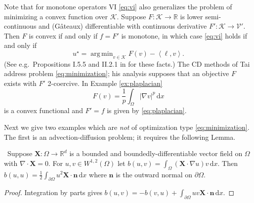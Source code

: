 \documentclass[review,hidelinks,onefignum,onetabnum,final]{siamart220329}  %
\newcommand{\RR}{\mathbb{R}}
\newcommand{\grad}{\nabla}
\newcommand{\Div}{\nabla\cdot}
\newcommand{\bn}{\mathbf{n}}
\newcommand{\bX}{\mathbf{X}}
\newcommand{\cK}{\mathcal{K}}
\newcommand{\cV}{\mathcal{V}}
\newcommand{\ip}[2]{\left<#1,#2\right>}
\newcommand{\dx}{\, \mathrm{d}x}
\DeclareMathOperator*{\argmin}{arg\,min}
\begin{document}
Note that for monotone operators VI \eqref{eq:vi} also generalizes the problem of minimizing a convex function over $\cK$.  Suppose $F:\cK \to \RR$ is lower semi-continuous and (G\^ateaux) differentiable with continuous derivative $F':\cK \to \cV'$.  Then $F$ is convex if and only if $f=F'$ is monotone, in which case \eqref{eq:vi} holds if and only if
\begin{equation}
u^\star = \argmin_{v\in\cK} F(v) - \ip{\ell}{v}. \label{eq:minimization}
\end{equation}
(See e.g.~Propositions I.5.5 and II.2.1 in \cite{EkelandTemam1976} for these facts.)  The CD methods of Tai \cite{Tai2003} address problem \eqref{eq:minimization}; his analysis supposes that an objective $F$ exists with $F'$ 2-coercive.  In Example \ref{ex:plaplacian}
\begin{equation}
F(v) = \frac{1}{p} \int_\Omega |\grad v|^p\dx \label{eq:plaplacianobjective}
\end{equation}
is a convex functional and $F' = f$ is given by \eqref{eq:plaplacian}.

Next we give two examples which are \emph{not} of optimization type \eqref{eq:minimization}.  The first is an advection-diffusion problem; it requires the following Lemma.

\begin{lemma}  \label{lem:advectionskew}  \cite{Elmanetal2014}\,  Suppose $\bX :\Omega \to \RR^d$ is a bounded and boundedly-differentiable vector field on $\Omega$ with $\Div \bX=0$.  For $u,v \in W^{1,2}(\Omega)$ let $b(u,v) = \int_\Omega (\bX \cdot \grad u) v\dx$.  Then $b(u,u) = \frac{1}{2} \int_{\partial \Omega} u^2 \bX\cdot \bn\dx$ where $\bn$ is the outward normal on $\partial \Omega$.
\end{lemma}

\begin{proof}
Integration by parts gives $b(u,v) = - b(v,u) + \int_{\partial \Omega} uv \bX\cdot \bn\dx$.
\end{proof}
\end{document}
